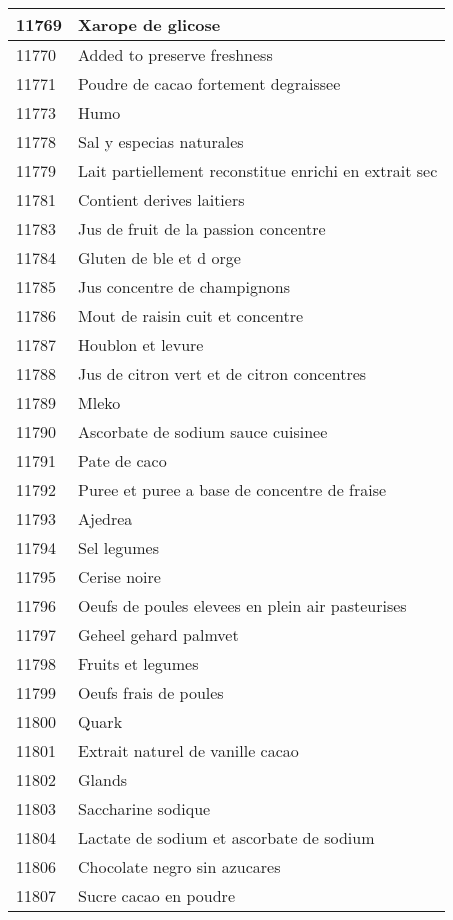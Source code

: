 \begin{longtable}{|l|l|}
11769 & Xarope de glicose \\ \hline 
11770 & Added to preserve freshness \\ \hline 
11771 & Poudre de cacao fortement degraissee \\ \hline 
11773 & Humo \\ \hline 
11778 & Sal y especias naturales \\ \hline 
11779 & Lait partiellement reconstitue enrichi en extrait sec \\ \hline 
11781 & Contient derives laitiers \\ \hline 
11783 & Jus de fruit de la passion concentre \\ \hline 
11784 & Gluten de ble et d orge \\ \hline 
11785 & Jus concentre de champignons \\ \hline 
11786 & Mout de raisin cuit et concentre \\ \hline 
11787 & Houblon et levure \\ \hline 
11788 & Jus de citron vert et de citron concentres \\ \hline 
11789 & Mleko \\ \hline 
11790 & Ascorbate de sodium sauce cuisinee \\ \hline 
11791 & Pate de caco \\ \hline 
11792 & Puree et puree a base de concentre de fraise \\ \hline 
11793 & Ajedrea \\ \hline 
11794 & Sel legumes \\ \hline 
11795 & Cerise noire \\ \hline 
11796 & Oeufs de poules elevees en plein air pasteurises \\ \hline 
11797 & Geheel gehard palmvet \\ \hline 
11798 & Fruits et legumes \\ \hline 
11799 & Oeufs frais de poules \\ \hline 
11800 & Quark \\ \hline 
11801 & Extrait naturel de vanille cacao \\ \hline 
11802 & Glands \\ \hline 
11803 & Saccharine sodique \\ \hline 
11804 & Lactate de sodium et ascorbate de sodium \\ \hline 
11806 & Chocolate negro sin azucares \\ \hline 
11807 & Sucre cacao en poudre \\ \hline 

\end{longtable}
